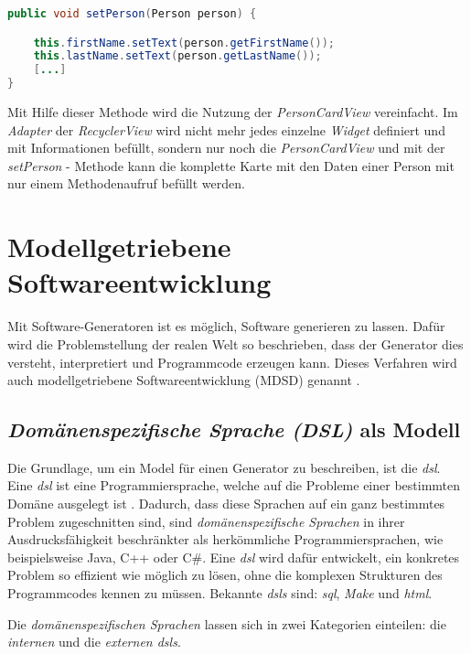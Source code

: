 \begin{lstlisting}[label=lst:setPerson,
language=java,
firstnumber=1,
caption=\textit{setPerson} - Methode aus der \textit{PersonCardView}.]				  
public void setPerson(Person person) {

	this.firstName.setText(person.getFirstName());
	this.lastName.setText(person.getLastName());	
	[...]
}
\end{lstlisting}


Mit Hilfe dieser Methode wird die Nutzung der \textit{PersonCardView} vereinfacht. Im \textit{Adapter} der \textit{RecyclerView} wird nicht mehr jedes einzelne \textit{Widget} definiert und mit Informationen befüllt, sondern nur noch die \textit{PersonCardView} und mit der \textit{setPerson} - Methode kann die komplette Karte mit den Daten einer Person mit nur einem Methodenaufruf befüllt werden.

\section{Modellgetriebene Softwareentwicklung}\label{sec:generators}

Mit Software-Generatoren ist es möglich, Software generieren zu lassen. Dafür wird die Problemstellung der realen Welt so beschrieben, dass der Generator dies versteht, interpretiert und Programmcode erzeugen kann.
Dieses Verfahren wird auch modellgetriebene Softwareentwicklung (MDSD) genannt \cite{mdsd}.

\subsection{\textit{Domänenspezifische Sprache (DSL)} als Modell}\label{sec:dsl}
Die Grundlage, um ein Model für einen Generator zu beschreiben, ist die \textit{\acl{dsl}}.
Eine \textit{\acs{dsl}} ist eine Programmiersprache, welche auf die Probleme einer bestimmten Domäne ausgelegt ist \cite{dslHudak}. Dadurch, dass diese Sprachen auf ein ganz bestimmtes Problem zugeschnitten sind, sind \textit{domänenspezifische Sprachen} in ihrer Ausdrucksfähigkeit beschränkter als herkömmliche Programmiersprachen, wie beispielsweise Java, C++ oder C\#. Eine \textit{\acl{dsl}} wird dafür entwickelt, ein konkretes Problem so effizient wie möglich zu lösen, ohne die komplexen Strukturen des Programmcodes kennen zu müssen.
Bekannte \textit{\aclp{dsl}} sind: \textit{\ac{sql}}, \textit{Make} und \textit{\acf{html}}.

Die \textit{domänenspezifischen Sprachen} lassen sich in zwei Kategorien einteilen: die \textit{internen} und die \textit{externen \acsp{dsl}}.

